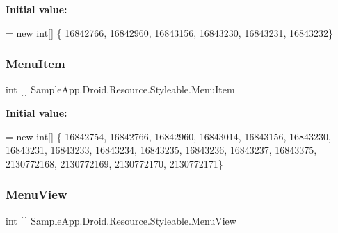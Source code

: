 {\bfseries Initial value\+:}
\begin{DoxyCode}
= \textcolor{keyword}{new} \textcolor{keywordtype}{int}[] \{
                    16842766,
                    16842960,
                    16843156,
                    16843230,
                    16843231,
                    16843232\}
\end{DoxyCode}
\mbox{\label{class_sample_app_1_1_droid_1_1_resource_1_1_styleable_a41530213cb43b6f3637c3685357130ed}} 
\subsubsection{\texorpdfstring{Menu\+Item}{MenuItem}}
{\footnotesize\ttfamily int \mbox{[}$\,$\mbox{]} Sample\+App.\+Droid.\+Resource.\+Styleable.\+Menu\+Item\hspace{0.3cm}{\ttfamily [static]}}

{\bfseries Initial value\+:}
\begin{DoxyCode}
= \textcolor{keyword}{new} \textcolor{keywordtype}{int}[] \{
                    16842754,
                    16842766,
                    16842960,
                    16843014,
                    16843156,
                    16843230,
                    16843231,
                    16843233,
                    16843234,
                    16843235,
                    16843236,
                    16843237,
                    16843375,
                    2130772168,
                    2130772169,
                    2130772170,
                    2130772171\}
\end{DoxyCode}
\mbox{\label{class_sample_app_1_1_droid_1_1_resource_1_1_styleable_a75d9e25be5148979c549296b4ebbe5d5}} 
\subsubsection{\texorpdfstring{Menu\+View}{MenuView}}
{\footnotesize\ttfamily int \mbox{[}$\,$\mbox{]} Sample\+App.\+Droid.\+Resource.\+Styleable.\+Menu\+View\hspace{0.3cm}{\ttfamily [static]}}

